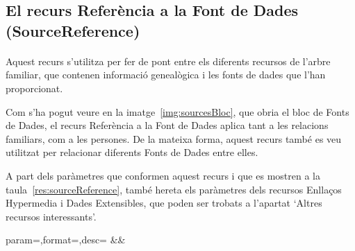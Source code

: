 \subsection{El recurs Referència a la Font de Dades (SourceReference)}

    \paragraph{}
    Aquest recurs s'utilitza per fer de pont entre els diferents recursos de l'arbre fa\-mi\-liar, que contenen informació genealògica i les fonts de dades que l'han proporcionat.

    Com s'ha pogut veure en la imatge~\ref{img:sourcesBloc}, que obria el bloc de Fonts de Dades, el recurs Referència a la Font de Dades aplica tant a les relacions familiars, com a les persones. De la mateixa forma, aquest recurs també es veu utilitzat per relacionar diferents Fonts de Dades entre elles.

    A part dels paràmetres que conformen aquest recurs i que es mostren a la taula~\ref{res:sourceReference}, també hereta els paràmetres dels recursos Enllaços Hypermedia i Dades Extensibles, que poden ser trobats a l'apartat `Altres recursos interessants'.

    \begin{center}
             {param=\param,format=\format,desc=\desc}
             {\param&\format&\desc}
     \end{center}
